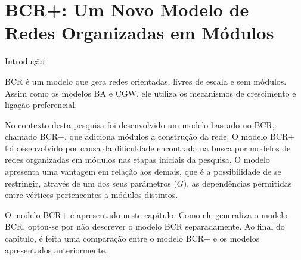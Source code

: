 \chapter{BCR+: Um Novo Modelo de Redes Organizadas em Módulos} \label{cap:bcr}

\begin{section}{Introdução}

BCR é um modelo que gera redes orientadas, livres de escala e sem módulos. Assim como os modelos BA e CGW, ele utiliza os mecanismos de crescimento e ligação preferencial.

No contexto desta pesquisa foi desenvolvido um modelo baseado no BCR, chamado BCR+, que adiciona módulos à construção da rede. O modelo BCR+ foi desenvolvido por causa da dificuldade encontrada na busca por modelos de redes organizadas em módulos nas etapas iniciais da pesquisa. O modelo apresenta uma vantagem em relação aos demais, que é a possibilidade de se restringir, através de um dos seus parâmetros ($G$), as dependências permitidas entre vértices pertencentes a módulos distintos.

O modelo BCR+ é apresentado neste capítulo. Como ele generaliza o modelo BCR, optou-se por não descrever o modelo BCR separadamente. Ao final do capítulo, é feita uma comparação entre o modelo BCR+ e os modelos apresentados anteriormente.

\end{section}

